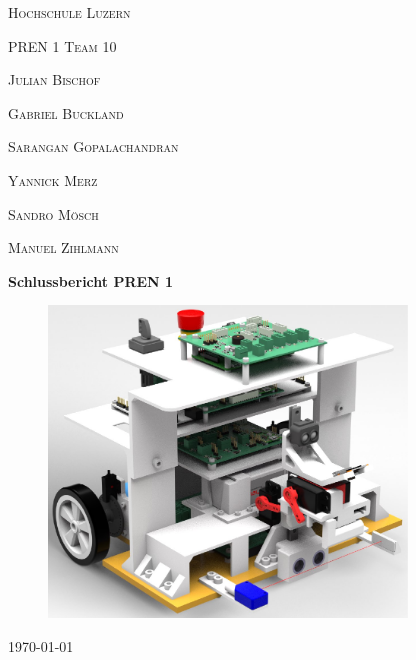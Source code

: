 \documentclass{scrarticle}                %
\begin{document}

\begin{titlepage}
    \centering
    {\scshape\LARGE Hochschule Luzern \par}
    \vspace{1cm}
    {\scshape\Large PREN 1 Team 10\par}
    \vspace{1cm}

    {\scshape\large Julian Bischof\par}
    {\scshape\large Gabriel Buckland\par}
    {\scshape\large Sarangan Gopalachandran \par}
    {\scshape\large Yannick Merz\par}
    {\scshape\large Sandro Mösch\par}
    {\scshape\large Manuel Zihlmann\par}

    \vspace{1.5cm}
    {\huge\bfseries Schlussbericht PREN 1 \par}

    \vspace{1cm}

    \begin{figure}[H]
        \centering
        \includegraphics[width=0.85\textwidth]{Render_Baugruppe.pdf}
    \end{figure}

    \vfill
    {\large \today\par}
\end{titlepage}
\end{document}
